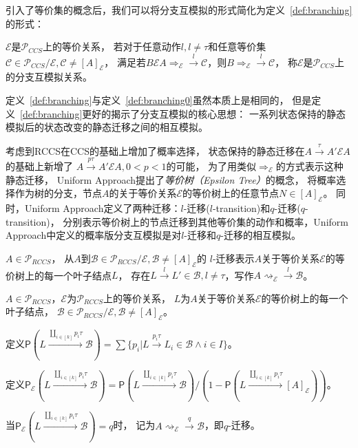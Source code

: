       引入了等价集的概念后，我们可以将分支互模拟的形式简化为定义~\ref{def:branching}的形式：
   \begin{definition}\label{def:branching}
      $\mathcal{E}$是$\mathcal{P}_{CCS}$上的等价关系，
      若对于任意动作$l,l\neq \tau$和任意等价集$\mathcal{C}\in \mathcal{P}_{CCS}/\mathcal{E}, \mathcal{C}\neq [A]_{\mathcal{E}}$，
      满足若$B\mathcal{E}A\Rightarrow_{\mathcal{E}}\stackrel{l}{\rightarrow}\mathcal{C}$，则$B\Rightarrow_{\mathcal{E}}\stackrel{l}{\rightarrow}\mathcal{C}$，
      称$\mathcal{E}$是$\mathcal{P}_{CCS}$上的分支互模拟关系。
   \end{definition}
   定义~\ref{def:branching}与定义~\ref{def:branching0}虽然本质上是相同的，
   但是定义~\ref{def:branching}更好的揭示了分支互模拟的核心思想：
   一系列状态保持的静态模拟后的状态改变的静态迁移之间的相互模拟。

   考虑到RCCS在CCS的基础上增加了概率选择，
   状态保持的静态迁移在$A\stackrel{\tau}{\rightarrow}A'\mathcal{E}A$的基础上新增了
   $A\stackrel{p\tau}{\rightarrow} A'\mathcal{E}A,0<p<1$的可能，
   为了用类似$\Rightarrow_{\mathcal{E}}$的方式表示这种静态迁移，
   Uniform Approach提出了\textit{等价树（Epsilon Tree）}的概念，
   将概率选择作为树的分支，节点$A$的关于等价关系$\mathcal{E}$的等价树上的任意节点$N\in [A]_{\mathcal{E}}$。
   同时，Uniform Approach定义了两种迁移：$l$-迁移($l$-transition)和$q$-迁移($q$-transition)，
   分别表示等价树上的节点迁移到其他等价集的动作和概率，Uniform Approach中定义的概率版分支互模拟是对$l$-迁移和$q$-迁移的相互模拟\cite{Fu_UniformApproach}。

   \begin{definition}[$l$-迁移($l$-transition)]
      $A\in \mathcal{P}_{RCCS}$，
      从$A$到$\mathcal{B}\in \mathcal{P}_{RCCS}/\mathcal{E},\mathcal{B}\neq [A]_{\mathcal{E}}$的
      $l$-迁移表示$A$关于等价关系$\mathcal{E}$的等价树上的每一个叶子结点$L$，
      存在$L\stackrel{l}{\rightarrow}L'\in\mathcal{B},l\neq \tau$，写作$A\rightsquigarrow_{\mathcal{E}}\stackrel{l}{\rightarrow}\mathcal{B}$。
   \end{definition}

   \begin{definition}[$q$-迁移($q$-transition)]
      $A\in \mathcal{P}_{RCCS}$，$\mathcal{E}$为$\mathcal{P}_{RCCS}$上的等价关系，
      $L$为$A$关于等价关系$\mathcal{E}$的等价树上的每一个叶子结点，
      $\mathcal{B}\in \mathcal{P}_{RCCS}/\mathcal{E}, \mathcal{B}\neq [A]_{\mathcal{E}}$。

      定义$\mathsf{P}(L\stackrel{\coprod_{i\in[k]}p_i\tau}{\longrightarrow}\mathcal{B})=\sum \{p_i|L\stackrel{p_i\tau}{\longrightarrow}L_i\in \mathcal{B}\wedge i\in I\}$。
      
      定义$\mathsf{P}_{\mathcal{E}}(L\stackrel{\coprod_{i\in[k]}p_i\tau}{\longrightarrow}\mathcal{B})=\mathsf{P}(L\stackrel{\coprod_{i\in[k]}p_i\tau}{\longrightarrow}\mathcal{B})/(1-\mathsf{P}(L\stackrel{\coprod_{i\in[k]}p_i\tau}{\longrightarrow}[A]_{\mathcal{E}}))$。

      当$\mathsf{P}_{\mathcal{E}}(L\stackrel{\coprod_{i\in[k]}p_i\tau}{\longrightarrow}\mathcal{B})=q$时，
      记为$A\rightsquigarrow_{\mathcal{E}}\stackrel{q}{\rightarrow}\mathcal{B}$，即$q$-迁移。
   \end{definition}


